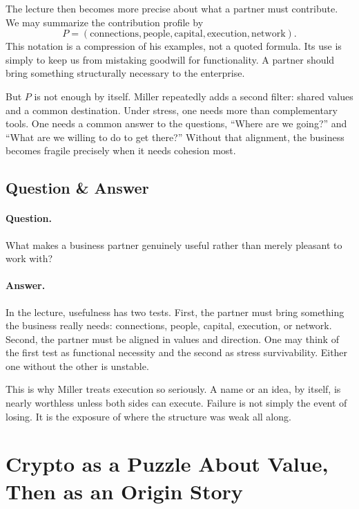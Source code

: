 The lecture then becomes more precise about what a partner must contribute. We may summarize the contribution profile by
\begin{equation}
P=(\text{connections},\text{people},\text{capital},\text{execution},\text{network}).
\end{equation}
This notation is a compression of his examples, not a quoted formula. Its use is simply to keep us from mistaking goodwill for functionality. A partner should bring something structurally necessary to the enterprise.

But \(P\) is not enough by itself. Miller repeatedly adds a second filter: shared values and a common destination. Under stress, one needs more than complementary tools. One needs a common answer to the questions, ``Where are we going?'' and ``What are we willing to do to get there?'' Without that alignment, the business becomes fragile precisely when it needs cohesion most.

\subsection{Question \& Answer}

\paragraph{Question.} What makes a business partner genuinely useful rather than merely pleasant to work with?

\paragraph{Answer.} In the lecture, usefulness has two tests. First, the partner must bring something the business really needs: connections, people, capital, execution, or network. Second, the partner must be aligned in values and direction. One may think of the first test as functional necessity and the second as stress survivability. Either one without the other is unstable.

This is why Miller treats execution so seriously. A name or an idea, by itself, is nearly worthless unless both sides can execute. Failure is not simply the event of losing. It is the exposure of where the structure was weak all along.

\section{Crypto as a Puzzle About Value, Then as an Origin Story}

